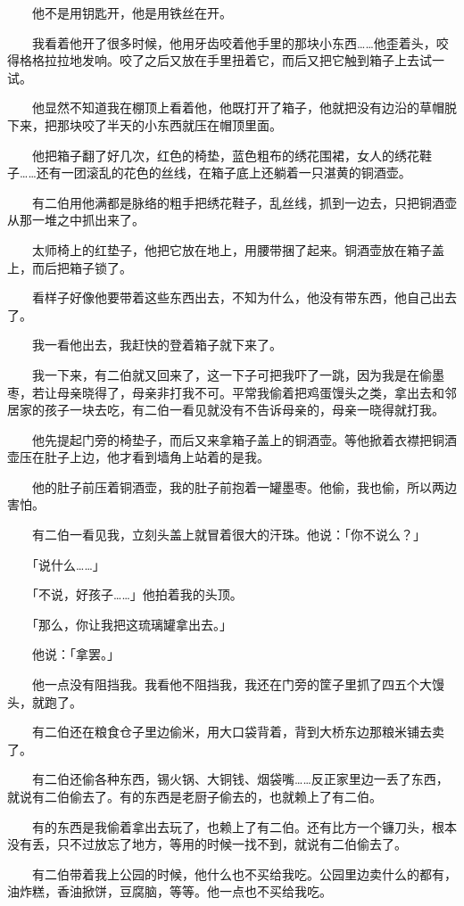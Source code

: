\documentclass[UTF8]{ctexart}
\begin{document}
　　他不是用钥匙开，他是用铁丝在开。

　　我看着他开了很多时候，他用牙齿咬着他手里的那块小东西……他歪着头，咬得格格拉拉地发响。咬了之后又放在手里扭着它，而后又把它触到箱子上去试一试。

　　他显然不知道我在棚顶上看着他，他既打开了箱子，他就把没有边沿的草帽脱下来，把那块咬了半天的小东西就压在帽顶里面。

　　他把箱子翻了好几次，红色的椅垫，蓝色粗布的绣花围裙，女人的绣花鞋子……还有一团滚乱的花色的丝线，在箱子底上还躺着一只湛黄的铜酒壶。

　　有二伯用他满都是脉络的粗手把绣花鞋子，乱丝线，抓到一边去，只把铜酒壶从那一堆之中抓出来了。

　　太师椅上的红垫子，他把它放在地上，用腰带捆了起来。铜酒壶放在箱子盖上，而后把箱子锁了。

　　看样子好像他要带着这些东西出去，不知为什么，他没有带东西，他自己出去了。

　　我一看他出去，我赶快的登着箱子就下来了。

　　我一下来，有二伯就又回来了，这一下子可把我吓了一跳，因为我是在偷墨枣，若让母亲晓得了，母亲非打我不可。平常我偷着把鸡蛋馒头之类，拿出去和邻居家的孩子一块去吃，有二伯一看见就没有不告诉母亲的，母亲一晓得就打我。

　　他先提起门旁的椅垫子，而后又来拿箱子盖上的铜酒壶。等他掀着衣襟把铜酒壶压在肚子上边，他才看到墙角上站着的是我。

　　他的肚子前压着铜酒壶，我的肚子前抱着一罐墨枣。他偷，我也偷，所以两边害怕。

　　有二伯一看见我，立刻头盖上就冒着很大的汗珠。他说：「你不说么？」

　　「说什么……」

　　「不说，好孩子……」他拍着我的头顶。

　　「那么，你让我把这琉璃罐拿出去。」

　　他说：「拿罢。」

　　他一点没有阻挡我。我看他不阻挡我，我还在门旁的筐子里抓了四五个大馒头，就跑了。

　　有二伯还在粮食仓子里边偷米，用大口袋背着，背到大桥东边那粮米铺去卖了。

　　有二伯还偷各种东西，锡火锅、大铜钱、烟袋嘴……反正家里边一丢了东西，就说有二伯偷去了。有的东西是老厨子偷去的，也就赖上了有二伯。

　　有的东西是我偷着拿出去玩了，也赖上了有二伯。还有比方一个镰刀头，根本没有丢，只不过放忘了地方，等用的时候一找不到，就说有二伯偷去了。

　　有二伯带着我上公园的时候，他什么也不买给我吃。公园里边卖什么的都有，油炸糕，香油掀饼，豆腐脑，等等。他一点也不买给我吃。
\end{document}
